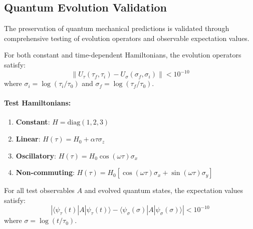 \subsection{Quantum Evolution Validation}
\label{subsec:quantum_evolution_validation}

The preservation of quantum mechanical predictions is validated through comprehensive testing of evolution operators and observable expectation values.

\begin{theorem}
\label{thm:unitary_evolution_validation}
For both constant and time-dependent Hamiltonians, the evolution operators satisfy:
\begin{equation}
\|U_\tau(\tau_f, \tau_i) - U_\sigma(\sigma_f, \sigma_i)\| < 10^{-10}
\end{equation}
where $\sigma_i = \log(\tau_i/\tau_0)$ and $\sigma_f = \log(\tau_f/\tau_0)$.
\end{theorem}

\paragraph{Test Hamiltonians:}
\begin{enumerate}
\item \textbf{Constant}: $H = \text{diag}(1, 2, 3)$ 
\item \textbf{Linear}: $H(\tau) = H_0 + \alpha \tau \sigma_z$
\item \textbf{Oscillatory}: $H(\tau) = H_0 \cos(\omega \tau) \sigma_x$
\item \textbf{Non-commuting}: $H(\tau) = H_0[\cos(\omega\tau)\sigma_x + \sin(\omega\tau)\sigma_y]$
\end{enumerate}

\begin{theorem}
\label{thm:observable_preservation_validation}
For all test observables $A$ and evolved quantum states, the expectation values satisfy:
\begin{equation}
|\langle \psi_\tau(t) | A | \psi_\tau(t) \rangle - \langle \psi_\sigma(\sigma) | A | \psi_\sigma(\sigma) \rangle| < 10^{-10}
\end{equation}
where $\sigma = \log(t/\tau_0)$.
\end{theorem}

